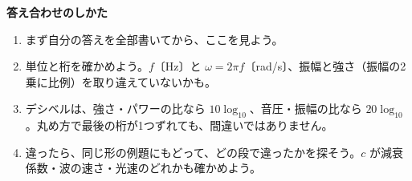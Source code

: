 \makeatletter
\def\phbkhead#1{\par\addvspace{4mm}\Needspace{6\baselineskip}\noindent{\sffamily\bfseries\large\color{bkDeep}#1}\par\nobreak\vspace{2mm}}
\newcommand\phyk{〔要確認〕}
\bkAnswerPages
\par\vspace{4mm}
\begin{tcolorbox}[bk base, unbreakable, colframe=bkTheme!60, colback=bkTheme!5, boxrule=0.8pt, arc=2mm, left=4mm, right=4mm, top=2mm, bottom=2mm]
{\sffamily\bfseries\color{bkDeep}答え合わせのしかた}\par\vspace{1mm}
\begin{enumerate}[label={\bkcircled{\arabic*}}, leftmargin=2.4\zw, itemsep=0pt, topsep=0pt]
\item まず自分の答えを全部書いてから、ここを見よう。
\item 単位と桁を確かめよう。$f$〔Hz〕と $\omega=2\pi f$〔rad/s〕、振幅と強さ（振幅の2乗に比例）を取り違えていないかも。
\item デシベルは、強さ・パワーの比なら $10\log_{10}$、音圧・振幅の比なら $20\log_{10}$。丸め方で最後の桁が1つずれても、間違いではありません。
\item 違ったら、同じ形の例題にもどって、どの段で違ったかを探そう。$c$ が減衰係数・波の速さ・光速のどれかも確かめよう。
\end{enumerate}
\end{tcolorbox}

